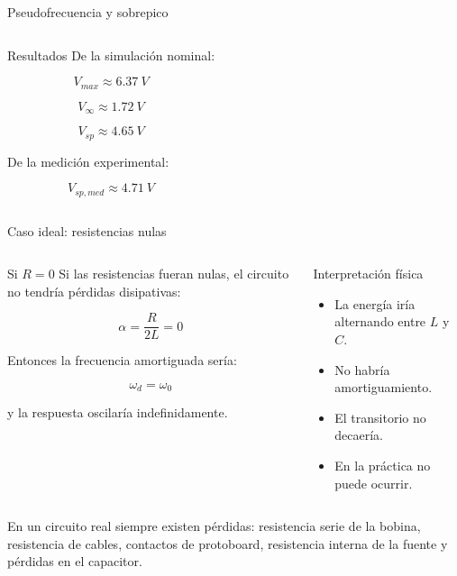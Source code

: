 \documentclass[aspectratio=169,11pt]{beamer}
\begin{document}
\begin{frame}{Pseudofrecuencia y sobrepico}
\begin{columns}[T,onlytextwidth]
\begin{block}{Resultados}
De la simulación nominal:

\begin{equation*}
V_{max}\approx \SI{6.37}{V}
\end{equation*}

\begin{equation*}
V_{\infty}\approx \SI{1.72}{V}
\end{equation*}

\begin{equation*}
\boxed{V_{sp}\approx \SI{4.65}{V}}
\end{equation*}

De la medición experimental:

\begin{equation*}
\boxed{V_{sp,med}\approx \SI{4.71}{V}}
\end{equation*}

\end{block}

\end{columns}

\vspace{0.15cm}


\end{frame}

\begin{frame}{Caso ideal: resistencias nulas}

\begin{columns}[c,onlytextwidth]

\begin{block}{Si $R=0$}
\scriptsize
Si las resistencias fueran nulas, el circuito no tendría pérdidas disipativas:

\[
\alpha = \frac{R}{2L}=0
\]

Entonces la frecuencia amortiguada sería:

\[
\omega_d=\omega_0
\]

y la respuesta oscilaría indefinidamente.
\end{block}

\begin{block}{Interpretación física}
\scriptsize
\begin{itemize}
    \item La energía iría alternando entre $L$ y $C$.
    \item No habría amortiguamiento.
    \item El transitorio no decaería.
    \item En la práctica no puede ocurrir.
\end{itemize}
\end{block}

\end{columns}

\vspace{0.15cm}

\scriptsize
En un circuito real siempre existen pérdidas: resistencia serie de la bobina, resistencia de cables, contactos de protoboard, resistencia interna de la fuente y pérdidas en el capacitor.

\end{frame}
\end{document}
